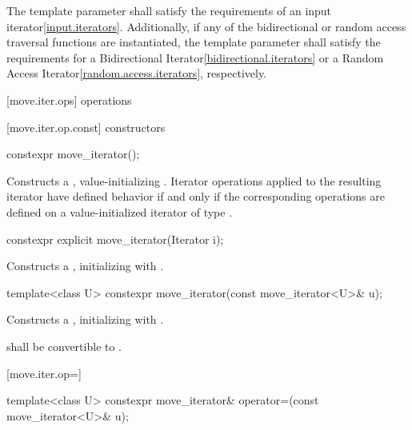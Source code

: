 \pnum
The template parameter  shall satisfy
the requirements of an input iterator\ref{input.iterators}.
Additionally, if any of the bidirectional or random access traversal
functions are instantiated, the template parameter shall satisfy the
requirements for a Bidirectional Iterator\ref{bidirectional.iterators}
or a Random Access Iterator\ref{random.access.iterators}, respectively.

[move.iter.ops]{ operations}

[move.iter.op.const]{ constructors}

%
\begin{itemdecl}
constexpr move_iterator();
\end{itemdecl}

\begin{itemdescr}
\pnum
\effects Constructs a , value-initializing
. Iterator operations applied to the resulting
iterator have defined behavior if and only if the corresponding operations are defined
on a value-initialized iterator of type .
\end{itemdescr}


%
\begin{itemdecl}
constexpr explicit move_iterator(Iterator i);
\end{itemdecl}

\begin{itemdescr}
\pnum
\effects Constructs a , initializing
 with .
\end{itemdescr}


%
\begin{itemdecl}
template<class U> constexpr move_iterator(const move_iterator<U>& u);
\end{itemdecl}

\begin{itemdescr}
\pnum
\effects Constructs a , initializing
 with .

\pnum
\requires {} shall be convertible to
.
\end{itemdescr}

[move.iter.op=]{}

%
\begin{itemdecl}
template<class U> constexpr move_iterator& operator=(const move_iterator<U>& u);
\end{itemdecl}

